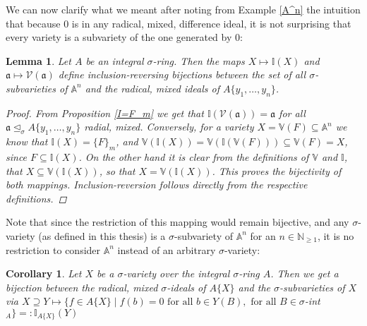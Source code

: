 \documentclass{article}
\def\I{\mathbb{I}}
\def\NE{\mathbb{N}_{\geq1}}
\def\V{\mathcal{V}}
\def\VV{\mathbb{V}}
\def\a{\mathfrak{a}}
\def\s{\sigma}
\def\si{\unlhd_{\sigma}}
\def\fa{\text{ for all }}
\newenvironment{bew}{\begin{proof}[Proof]}{\end{proof}}
\theoremstyle{plain}
\newtheorem{cor}[Satz]{Corollary}
\newtheorem{lem}[Satz]{Lemma}
\theoremstyle{definition}
\begin{document}
We can now clarify what we meant after noting from Example \ref{A^n} the intuition that because $0$ is in any radical, mixed, difference ideal, it is not surprising that every variety is a subvariety of the one generated by $0$:

 \begin{lem}
Let $A$ be an integral $\s$-ring. Then the maps $X \mapsto \I(X)$ and $\a \mapsto \V(\a)$ define inclusion-reversing bijections between the set of all $\s$-subvarieties of $\mathbb{A}^n$ and the radical, mixed ideals of $A\{y_1,\ldots,y_n\}$.
\begin{bew}
From Proposition \ref{I=F_m} we get that $\I(\V(\a)) = \a$ for all $\a \si A\{y_1,\ldots,y_n\}$ radial, mixed. Conversely, for a variety $X = \VV(F) \subseteq \mathbb{A}^n$ we know that $\I(X) = \{F\}_m$, and $\VV(\I(X)) = \VV(\I(\VV(F))) \subseteq \VV(F) = X$,
 since $F \subseteq \I(X)$. On the other hand it is clear from the definitions of $\VV$ and $ \I$, that $X \subseteq \VV(\I(X))$, so that $X = \VV(\I(X))$. This proves the bijectivity of both mappings. Inclusion-reversion follows directly from the respective definitions.
\end{bew}
\end{lem}

Note that since the restriction of this mapping would remain bijective, and any $\s$-variety (as defined in this thesis) is a $\s$-subvariety of $\mathbb{A}^n$ for an $n \in \NE$, it is no restriction to consider $\mathbb{A}^n$ instead of an arbitrary $\s$-variety:
\begin{cor}
  Let $X$ be a $\s$-variety over the integral $\s$-ring $A$. Then we get a bijection between the radical, mixed $\s$-ideals of $A\{X\}$ and the $\s$-subvarieties of $X$ via $X \supseteq Y \mapsto \{f \in A\{X\} \mid f(b) = 0 \fa b \in Y(B), \fa B \in \s$-int$_A \} =: \I_{A\{X\}}(Y)$
\end{cor}
\end{document}
